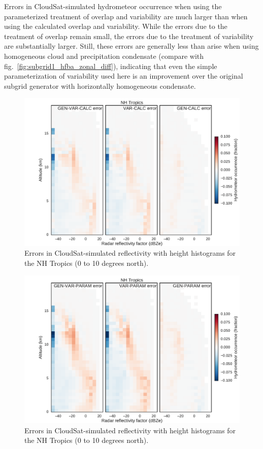 Errors in CloudSat-simulated hydrometeor occurrence when using the
parameterized treatment of overlap and variability are much larger than
when using the calculated overlap and variability. While the errors due
to the treatment of overlap remain small, the errors due to the
treatment of variability are substantially larger. Still, these errors
are generally less than arise when using homogeneous cloud and
precipitation condensate (compare with
fig.~\ref{fig:subgrid1_hfba_zonal_diff}), indicating that even the
simple parameterization of variability used here is an improvement over
the original subgrid generator with horizontally homogeneous condensate.

\begin{figure}[htbp]
\centering
\includegraphics{graphics/subgrid2_cfadDbze94_NHTropics_gen-var-calc_diff.pdf}
\caption{\label{fig:subgrid2_cfadDbze94_nhtropics_diff}Errors in
CloudSat-simulated reflectivity with height histograms for the NH
Tropics (0 to 10 degrees
north).}\label{fig:subgrid2ux5fcfadDbze94ux5fnhtropicsux5fdiff}
\end{figure}

\begin{figure}[htbp]
\centering
\includegraphics{graphics/subgrid2_cfadDbze94_NHTropics_gen-var-param_diff.pdf}
\caption{\label{fig:subgrid2_cfadDbze94_nhtropics_gen-var-param_diff}Errors
in CloudSat-simulated reflectivity with height histograms for the NH
Tropics (0 to 10 degrees
north).}\label{fig:subgrid2ux5fcfadDbze94ux5fnhtropicsux5fgen-var-paramux5fdiff}
\end{figure}

